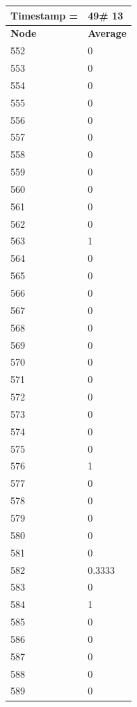 \begin{tabular}{|l||l|}
\hline
\textbf{Timestamp =} & \textbf{49}\# 13\\\hline
	\textbf{Node} & \textbf{Average} \\ \hline
\hline
	552 & 0 \\ \hline
	553 & 0 \\ \hline
	554 & 0 \\ \hline
	555 & 0 \\ \hline
	556 & 0 \\ \hline
	557 & 0 \\ \hline
	558 & 0 \\ \hline
	559 & 0 \\ \hline
	560 & 0 \\ \hline
	561 & 0 \\ \hline
	562 & 0 \\ \hline
	563 & 1 \\ \hline
	564 & 0 \\ \hline
	565 & 0 \\ \hline
	566 & 0 \\ \hline
	567 & 0 \\ \hline
	568 & 0 \\ \hline
	569 & 0 \\ \hline
	570 & 0 \\ \hline
	571 & 0 \\ \hline
	572 & 0 \\ \hline
	573 & 0 \\ \hline
	574 & 0 \\ \hline
	575 & 0 \\ \hline
	576 & 1 \\ \hline
	577 & 0 \\ \hline
	578 & 0 \\ \hline
	579 & 0 \\ \hline
	580 & 0 \\ \hline
	581 & 0 \\ \hline
	582 & 0.3333 \\ \hline
	583 & 0 \\ \hline
	584 & 1 \\ \hline
	585 & 0 \\ \hline
	586 & 0 \\ \hline
	587 & 0 \\ \hline
	588 & 0 \\ \hline
	589 & 0 \\ \hline
\end{tabular}

